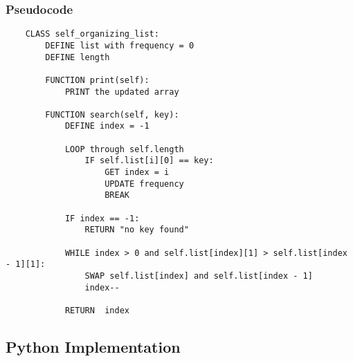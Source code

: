 \documentclass{article}
\begin{document}
\subsubsection*{Pseudocode}
\begin{lstlisting}
    CLASS self_organizing_list:
        DEFINE list with frequency = 0
        DEFINE length
    
        FUNCTION print(self):
            PRINT the updated array

        FUNCTION search(self, key):
            DEFINE index = -1

            LOOP through self.length
                IF self.list[i][0] == key:
                    GET index = i
                    UPDATE frequency
                    BREAK
                
            IF index == -1:
                RETURN "no key found"
                
            WHILE index > 0 and self.list[index][1] > self.list[index - 1][1]:
                SWAP self.list[index] and self.list[index - 1]
                index--

            RETURN  index
\end{lstlisting}

\subsection*{Python Implementation}
\end{document}
